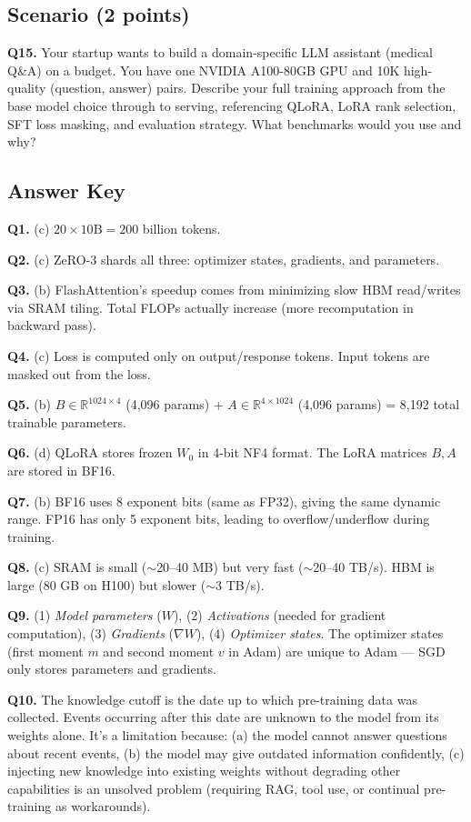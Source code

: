 \documentclass[11pt, a4paper]{article}
\begin{document}
\subsection*{Scenario (2 points)}

\textbf{Q15.} Your startup wants to build a domain-specific LLM assistant (medical Q\&A) on a budget. You have one NVIDIA A100-80GB GPU and 10K high-quality (question, answer) pairs. Describe your full training approach from the base model choice through to serving, referencing QLoRA, LoRA rank selection, SFT loss masking, and evaluation strategy. What benchmarks would you use and why?

\newpage
\subsection*{Answer Key}

\textbf{Q1.} (c) $20 \times 10\text{B} = 200$ billion tokens.

\textbf{Q2.} (c) ZeRO-3 shards all three: optimizer states, gradients, and parameters.

\textbf{Q3.} (b) FlashAttention's speedup comes from minimizing slow HBM read/writes via SRAM tiling. Total FLOPs actually increase (more recomputation in backward pass).

\textbf{Q4.} (c) Loss is computed only on output/response tokens. Input tokens are masked out from the loss.

\textbf{Q5.} (b) $B \in \mathbb{R}^{1024 \times 4}$ (4,096 params) + $A \in \mathbb{R}^{4 \times 1024}$ (4,096 params) = 8,192 total trainable parameters.

\textbf{Q6.} (d) QLoRA stores frozen $W_0$ in 4-bit NF4 format. The LoRA matrices $B, A$ are stored in BF16.

\textbf{Q7.} (b) BF16 uses 8 exponent bits (same as FP32), giving the same dynamic range. FP16 has only 5 exponent bits, leading to overflow/underflow during training.

\textbf{Q8.} (c) SRAM is small ($\sim$20--40 MB) but very fast ($\sim$20--40 TB/s). HBM is large (80 GB on H100) but slower ($\sim$3 TB/s).

\textbf{Q9.} (1) \textit{Model parameters} ($W$), (2) \textit{Activations} (needed for gradient computation), (3) \textit{Gradients} ($\nabla W$), (4) \textit{Optimizer states}. The optimizer states (first moment $m$ and second moment $v$ in Adam) are unique to Adam --- SGD only stores parameters and gradients.

\textbf{Q10.} The knowledge cutoff is the date up to which pre-training data was collected. Events occurring after this date are unknown to the model from its weights alone. It's a limitation because: (a) the model cannot answer questions about recent events, (b) the model may give outdated information confidently, (c) injecting new knowledge into existing weights without degrading other capabilities is an unsolved problem (requiring RAG, tool use, or continual pre-training as workarounds).
\end{document}
